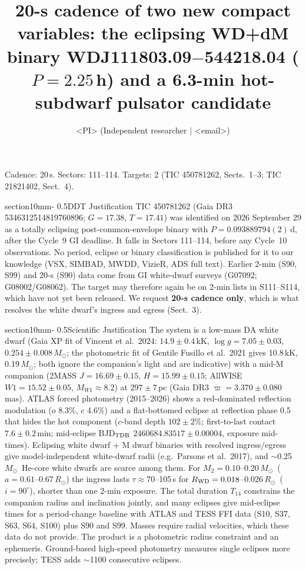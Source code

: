 \documentclass[letterpaper,11pt]{article}
\title{20-s cadence of two new compact variables: the eclipsing WD+dM binary WDJ111803.09$-$544218.04 ($P=2.25$\,h) and a 6.3-min hot-subdwarf pulsator candidate}
\author{<PI> (Independent researcher $|$ <email>)}
\date{}
\makeatletter
\renewcommand{\section}{\@startsection%
{section}{1}{0mm}{-\baselineskip}%
{0.5\baselineskip}{\normalfont\Large\bfseries}}%
\newcommand{\msun}{$M_{\odot}$}
\newcommand{\rsun}{$R_{\odot}$}
\makeatother
\begin{document}
\pagestyle{plain}
\maketitle
\vspace{-2em}
\noindent Cadence: 20\,s. Sectors: 111--114. Targets: 2 (TIC 450781262, Sects.~1--3; TIC 21821402, Sect.~4).

\section{DDT Justification}
TIC 450781262 (Gaia DR3 5346312514819760896; $G=17.38$, $T=17.41$) was identified on 2026 September 29 as a totally eclipsing post-common-envelope binary with $P=0.093889794(2)$\,d, after the Cycle~9 GI deadline. It falls in Sectors 111--114, before any Cycle~10 observations. No period, eclipse or binary classification is published for it to our knowledge (VSX, SIMBAD, MWDD, VizieR, ADS full text). Earlier 2-min (S90, S99) and 20-s (S90) data come from GI white-dwarf surveys (G07092; G08002/G08062). The target may therefore again be on 2-min lists in S111--S114, which have not yet been released. We request \textbf{20-s cadence only}, which is what resolves the white dwarf's ingress and egress (Sect.~3).

\section{Scientific Justification}
The system is a low-mass DA white dwarf (Gaia XP fit of Vincent et al.\ 2024: $14.9\pm0.4$\,kK, $\log g=7.05\pm0.03$, $0.254\pm0.008$\,\msun; the photometric fit of Gentile Fusillo et al.\ 2021 gives 10.8\,kK, 0.19\,\msun; both ignore the companion's light and are indicative) with a mid-M companion (2MASS $J=16.69\pm0.15$, $H=15.99\pm0.15$; AllWISE $W1=15.52\pm0.05$, $M_{W1}\approx8.2$) at $297\pm7$\,pc (Gaia DR3 $\varpi=3.370\pm0.080$\,mas). ATLAS forced photometry (2015--2026) shows a red-dominated reflection modulation ($o$ 8.3\%, $c$ 4.6\%) and a flat-bottomed eclipse at reflection phase 0.5 that hides the hot component ($c$-band depth $102\pm2$\%; first-to-last contact $7.6\pm0.2$\,min; mid-eclipse BJD$_{\rm TDB}$ $2460684.83517\pm0.00004$, exposure mid-times). Eclipsing white dwarf + M dwarf binaries with resolved ingress/egress give model-independent white-dwarf radii (e.g.\ Parsons et al.\ 2017), and $\sim$0.25\,\msun\ He-core white dwarfs are scarce among them. For $M_2=0.10$--0.20\,\msun\ ($a=0.61$--0.67\,\rsun) the ingress lasts $\tau\approx70$--105\,s for $R_{\rm WD}=0.018$--0.026\,\rsun\ ($i=90^\circ$), shorter than one 2-min exposure. The total duration $T_{14}$ constrains the companion radius and inclination jointly, and many eclipses give mid-eclipse times for a period-change baseline with ATLAS and TESS FFI data (S10, S37, S63, S64, S100) plus S90 and S99. Masses require radial velocities, which these data do not provide. The product is a photometric radius constraint and an ephemeris. Ground-based high-speed photometry measures single eclipses more precisely; TESS adds $\sim$1100 consecutive eclipses.
\end{document}
